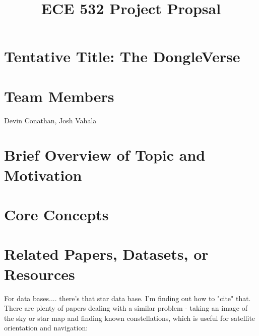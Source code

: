 \documentclass{article}
\title{ECE 532 Project Propsal}
\date{}
\author{}
\begin{document}


\maketitle

\section{Tentative Title: The DongleVerse\textsuperscript{\textregistered}}

\section{Team Members}
Devin Conathan, Josh Vahala

\section{Brief Overview of Topic and Motivation}

\section{Core Concepts}

\section{Related Papers, Datasets, or Resources}
For data bases.... there's that star data base. I'm finding out how to "cite" that.
There are plenty of papers dealing with a similar problem - taking an image of the sky or star map and finding known constellations, which is useful for satellite orientation and navigation:
\\\\
\\\\
\\\\
\end{document}
